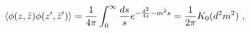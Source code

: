 \begin{equation}\label{2.11}
\langle \phi(z,\bar{z}) \phi(z',\bar{z}') \rangle=
{1 \over 4\pi}\int_0^\infty {ds \over s}e^{-{d^2 \over 4s}-m^2s}=
{1 \over 2\pi}K_0(d^2m^2)~,
\end{equation}

